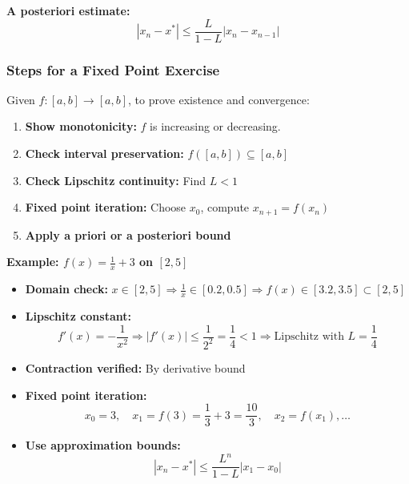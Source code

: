 \textbf{A posteriori estimate:}
\[
|x_n - x^*| \le \frac{L}{1 - L} |x_n - x_{n-1}|
\]

\subsubsection{Steps for a Fixed Point Exercise}

Given \(f: [a, b] \to [a, b]\), to prove existence and convergence:

\begin{enumerate}
    \item \textbf{Show monotonicity:} \(f\) is increasing or decreasing.
    \item \textbf{Check interval preservation:} \(f([a, b]) \subseteq [a, b]\)
    \item \textbf{Check Lipschitz continuity:} Find \(L < 1\)
    \item \textbf{Fixed point iteration:} Choose \(x_0\), compute \(x_{n+1} = f(x_n)\)
    \item \textbf{Apply a priori or a posteriori bound}
\end{enumerate}

\textbf{Example: \(f(x) = \frac{1}{x} + 3\) on \([2, 5]\)}

\begin{itemize}[label=\(-\)]
\item \textbf{Domain check:} \(x \in [2, 5] \Rightarrow \frac{1}{x} \in [0.2, 0.5] \Rightarrow f(x) \in [3.2, 3.5] \subset [2, 5]\)
\item \textbf{Lipschitz constant:}
\[
f'(x) = -\frac{1}{x^2} \Rightarrow |f'(x)| \le \frac{1}{2^2} = \frac{1}{4} < 1
\Rightarrow \text{Lipschitz with } L = \frac{1}{4}
\]
\item \textbf{Contraction verified:} By derivative bound
\item \textbf{Fixed point iteration:}
\[
x_0 = 3, \quad x_1 = f(3) = \frac{1}{3} + 3 = \frac{10}{3}, \quad x_2 = f(x_1), \dots
\]
\item \textbf{Use approximation bounds:}
\[
|x_n - x^*| \le \frac{L^n}{1 - L} |x_1 - x_0|
\]
\end{itemize}
\newpage